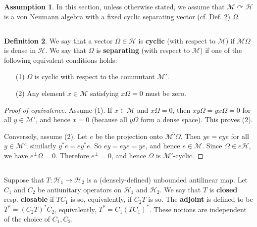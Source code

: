 \documentclass[12pt,b5paper,notitlepage]{article}
\theoremstyle{definition}
\newtheorem{df}{Definition}[section]
\newtheorem{ass}[df]{Assumption}
\theoremstyle{plain}
\newcommand{\mc}{\mathcal}
\newcommand{\ovl}{\overline}
\numberwithin{equation}{section}
\begin{document}
 

\begin{ass}\label{lb95}
In this section, unless otherwise stated, we assume that $\mc M\curvearrowright\mc H$ is a von Neumann algebra with a fixed cyclic separating vector (cf. Def. \ref{lb91}) $\Omega$.
\end{ass}


\subsection{}


\begin{df}\label{lb91}
We say that a vector $\Omega\in\mc H$ is \textbf{cyclic}  (with respect to $\mc M$) if $\mc M\Omega$ is dense in $\mc H$.  We say that $\Omega$ is \textbf{separating} (with respect to $\mc M$)  if one of the following equivalent conditions holds:
\begin{enumerate}
\item[(1)] $\Omega$ is cyclic with respect to the commutant $\mc M'$.
\item[(2)] Any element $x\in\mc M$ satisfying $x\Omega=0$ must be zero.
\end{enumerate}
\end{df}





\begin{proof}[Proof of equivalence]
Assume (1). If $x\in\mc M$ and $x\Omega=0$, then $xy\Omega=yx\Omega=0$ for all $y\in\mc M'$, and hence $x=0$ (because all $y\Omega$ form a dense space). This proves (2).

Conversely, assume (2). Let $e$ be the projection onto $\ovl{\mc M'\Omega}$. Then $ye=eye$ for all $y\in\mc M'$; similarly $y^*e=ey^*e$. So $ey=eye=ye$, and hence $e\in\mc M$. Since $\Omega\in e\mc H$, we have $e^\perp\Omega=0$. Therefore $e^\perp=0$, and hence $\Omega$ is $\mc M'$-cyclic.
\end{proof}


\subsection{}


Suppose that $T:\mc H_1\rightarrow\mc H_2$ is a (densely-defined) unbounded antilinear map. Let $C_1$ and $C_2$ be antiunitary operators on $\mc H_1$ and $\mc H_2$. We say that $T$ is \textbf{closed} resp. \textbf{closable} if $TC_1$ is so, equivalently, if $C_2T$ is so. The \textbf{adjoint} is defined to be $T^*=(C_2T)^*C_2$, equivalently, $T^*=C_1(TC_1)^*$. These notions are independent of the choice of $C_1,C_2$. 
\end{document}
